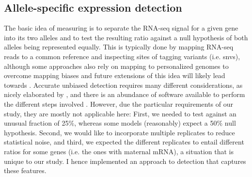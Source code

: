 \subsection{Allele-specific expression detection}
\label{sec:balancer_ase_impl}

The basic idea of measuring \ase is to separate the RNA-seq signal for a given
gene into its two alleles and to test the resulting ratio against a null
hypothesis of both alleles being represented equally. This is typically done by
mapping RNA-seq reads to a common reference and inspecting sites of tagging
variants (i.e. \acp{snv}), although some approaches also rely on mapping to
personalized genomes to overcome mapping biases \citep{Rozowsky2014} and future
extensions of this idea will likely lead towards 
\citep{Dilthey2015,Marschall2016,Novak101378}. Accurate unbiased \ase detection         
requires many different considerations, as nicely elaborated by \cite{Castel2015},
and there is an abundance of software available to perform the different steps
involved \citep{Skelly2011,Mayba2014,Harvey2014,Pirinen2015,Romanel2015,VandeGeijn2015,Liu2016}.
However, due the particular requirements of our study, they are mostly not
applicable here: First, we needed to test \ase against an unusual fraction of 25\%,
whereas some models (reasonably) expect a 50\% null hypothesis. Second, we
would like to incorporate multiple replicates to reduce statistical noise, and third,
we expected the different replicates to entail different \ase ratios for some
genes (i.e. the ones with maternal mRNA), a situation that is unique to our
study. I hence implemented an approach to \ase detection that captures these
features.

